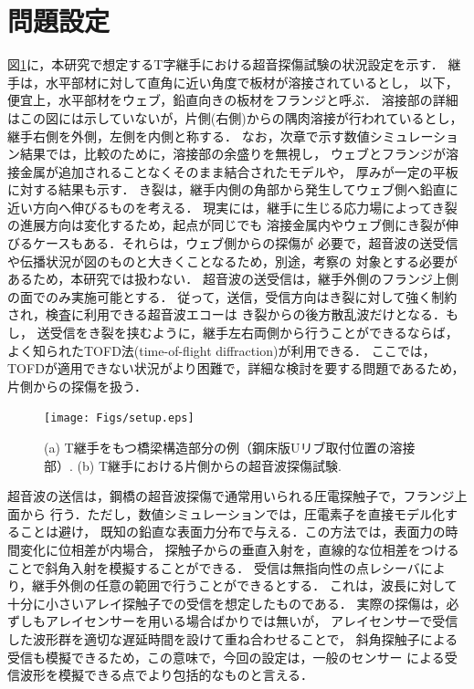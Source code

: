 ﻿%
\section{問題設定}
図\ref{fig:fig2_0}に，本研究で想定するT字継手における超音探傷試験の状況設定を示す．
継手は，水平部材に対して直角に近い角度で板材が溶接されているとし，
以下，便宜上，水平部材をウェブ，鉛直向きの板材をフランジと呼ぶ．
溶接部の詳細はこの図には示していないが，片側(右側)からの隅肉溶接が行われているとし，
継手右側を外側，左側を内側と称する．
なお，次章で示す数値シミュレーション結果では，比較のために，溶接部の余盛りを無視し，
ウェブとフランジが溶接金属が追加されることなくそのまま結合されたモデルや，
厚みが一定の平板に対する結果も示す．
き裂は，継手内側の角部から発生してウェブ側へ鉛直に近い方向へ伸びるものを考える．
現実には，継手に生じる応力場によってき裂の進展方向は変化するため，起点が同じでも
溶接金属内やウェブ側にき裂が伸びるケースもある．それらは，ウェブ側からの探傷が
必要で，超音波の送受信や伝播状況が図のものと大きくことなるため，別途，考察の
対象とする必要があるため，本研究では扱わない．
超音波の送受信は，継手外側のフランジ上側の面でのみ実施可能とする．
従って，送信，受信方向はき裂に対して強く制約され，検査に利用できる超音波エコーは
き裂からの後方散乱波だけとなる．もし，
送受信をき裂を挟むように，継手左右両側から行うことができるならば，
よく知られたTOFD法(time-of-flight diffraction)が利用できる．
ここでは，TOFDが適用できない状況がより困難で，詳細な検討を要する問題であるため，
片側からの探傷を扱う．
\begin{figure}[h]
	\begin{center}
	\texttt{[image: Figs/setup.eps]} 
	\end{center}
	\caption{
		(a) T継手をもつ橋梁構造部分の例（鋼床版Uリブ取付位置の溶接部）.
		(b) T継手における片側からの超音波探傷試験.
	} 
	\label{fig:fig2_0}
\end{figure}
超音波の送信は，鋼橋の超音波探傷で通常用いられる圧電探触子で，フランジ上面から
行う．ただし，数値シミュレーションでは，圧電素子を直接モデル化することは避け，
既知の鉛直な表面力分布で与える．この方法では，表面力の時間変化に位相差が内場合，
探触子からの垂直入射を，直線的な位相差をつけることで斜角入射を模擬することができる．
受信は無指向性の点レシーバにより，継手外側の任意の範囲で行うことができるとする．
これは，波長に対して十分に小さいアレイ探触子での受信を想定したものである．
実際の探傷は，必ずしもアレイセンサーを用いる場合ばかりでは無いが，
アレイセンサーで受信した波形群を適切な遅延時間を設けて重ね合わせることで，
斜角探触子による受信も模擬できるため，この意味で，今回の設定は，一般のセンサー
による受信波形を模擬できる点でより包括的なものと言える．
